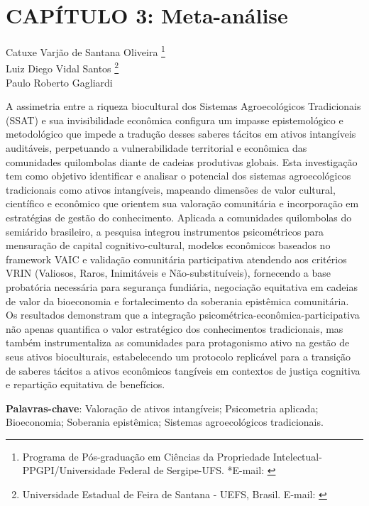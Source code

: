 \pagestyle{plain}

\chapter{CAPÍTULO 3: Meta-análise}


\begin{flushright}
Catuxe Varjão de Santana Oliveira  \footnote[1]{Programa de Pós-graduação em Ciências da Propriedade Intelectual-PPGPI/Universidade Federal de Sergipe-UFS. *E-mail:  \href{mailto:catuxe@academico.ufs.br}{}}
\\[0.3cm]
Luiz Diego Vidal Santos \footnote[2]{Universidade Estadual de Feira de Santana - UEFS, Brasil. E-mail: \href{mailto:ldvsantos@uefs.br}{}}
\\[0.3cm]
Paulo Roberto Gagliardi \footnotemark[1]
\end{flushright}


{\renewcommand{\PRIVATEbookmarkthis}[1]{}%
\begin{resumoumacoluna}
A assimetria entre a riqueza biocultural dos Sistemas Agroecológicos Tradicionais (SSAT) e sua invisibilidade econômica configura um impasse epistemológico e metodológico que impede a tradução desses saberes tácitos em ativos intangíveis auditáveis, perpetuando a vulnerabilidade territorial e econômica das comunidades quilombolas diante de cadeias produtivas globais. Esta investigação tem como objetivo identificar e analisar o potencial dos sistemas agroecológicos tradicionais como ativos intangíveis, mapeando dimensões de valor cultural, científico e econômico que orientem sua valoração comunitária e incorporação em estratégias de gestão do conhecimento. Aplicada a comunidades quilombolas do semiárido brasileiro, a pesquisa integrou instrumentos psicométricos para mensuração de capital cognitivo-cultural, modelos econômicos baseados no framework VAIC e validação comunitária participativa atendendo aos critérios VRIN (Valiosos, Raros, Inimitáveis e Não-substituíveis), fornecendo a base probatória necessária para segurança fundiária, negociação equitativa em cadeias de valor da bioeconomia e fortalecimento da soberania epistêmica comunitária. Os resultados demonstram que a integração psicométrica-econômica-participativa não apenas quantifica o valor estratégico dos conhecimentos tradicionais, mas também instrumentaliza as comunidades para protagonismo ativo na gestão de seus ativos bioculturais, estabelecendo um protocolo replicável para a transição de saberes tácitos a ativos econômicos tangíveis em contextos de justiça cognitiva e repartição equitativa de benefícios.

\vspace{\onelineskip}
\noindent
\textbf{Palavras-chave}: Valoração de ativos intangíveis; Psicometria aplicada; Bioeconomia; Soberania epistêmica; Sistemas agroecológicos tradicionais.
\end{resumoumacoluna}}

